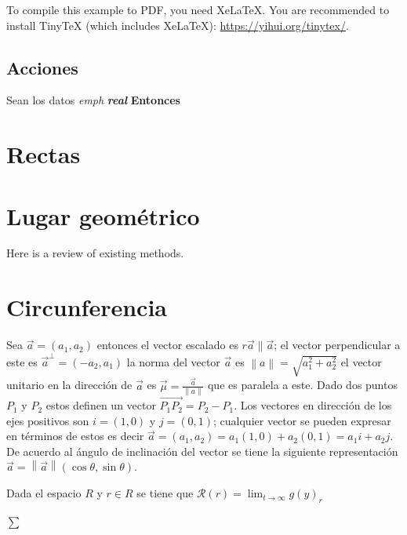 \documentclass[12pt,]{report}
\theoremstyle{definition}
\theoremstyle{definition}
\theoremstyle{definition}
\theoremstyle{remark}
\let\BeginKnitrBlock\begin \let\EndKnitrBlock\end
\begin{document}
To compile this example to PDF, you need XeLaTeX. You are recommended to install TinyTeX (which includes XeLaTeX): \url{https://yihui.org/tinytex/}.

\hypertarget{acciones}{%
\section{Acciones}\label{acciones}}

Sean los datos \emph{emph} \textbf{\emph{real}} \textbf{Entonces}

\hypertarget{intro}{%
\chapter{Rectas}\label{intro}}

\hypertarget{lugar-geomuxe9trico}{%
\chapter{Lugar geométrico}\label{lugar-geomuxe9trico}}

Here is a review of existing methods.

\hypertarget{circunferencia}{%
\chapter{Circunferencia}\label{circunferencia}}

Sea \(\vec{a}=(a_1,a_2)\) entonces el vector escalado es \(r\vec{a}\parallel\vec{a}\); el vector perpendicular a este es \(\vec{a}^\perp=(-a_2,a_1)\) la norma del vector \(\vec{a}\) es \(\left\|a\right\|=\sqrt{a_1^2+a_2^2}\) el vector unitario en la dirección de \(\vec{a}\) es \(\vec{\mu}=\frac{\vec{a}}{\left\|a\right\|}\) que es paralela a este. Dado dos puntos \(P_1\) y \(P_2\) estos definen un vector \(\vec{P_1P_2}=P_2-P_1\). Los vectores en dirección de los ejes positivos son \(i=(1,0)\) y \(j=(0,1)\); cualquier vector se pueden expresar en términos de estos es decir \(\vec{a}=(a_1,a_2)=a_1(1,0)+a_2(0,1)=a_1i+a_2j\). De acuerdo al ángulo de inclinación del vector se tiene la siguiente representación \(\vec{a}=\left\|\vec{a}\right\|(\cos\theta,\sin\theta)\).

\BeginKnitrBlock{theorem}[russ]
\protect\hypertarget{thm:www}{}{\label{thm:www} {} }Dada el espacio \(R\) y \(r\in R\) se tiene que \(\mathcal{R}(r)=\lim_{t\to\infty}g(y)_r\)
\EndKnitrBlock{theorem}

\(\sum\)
\end{document}
